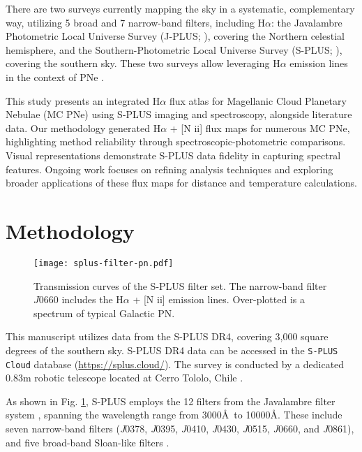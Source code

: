 \documentclass[baaa]{baaa}
\begin{document}
There are two surveys currently mapping the sky in a systematic, complementary way, utilizing 5 broad and 7 narrow-band filters,
including H$\alpha$: the Javalambre Photometric Local Universe Survey (J-PLUS; \citealp{Cenarro:2019}), covering the Northern celestial hemisphere,
and the Southern-Photometric Local Universe Survey (S-PLUS; \citealp{Mendes:2019}), covering the southern sky. These two surveys allow leveraging H$\alpha$ emission lines in the context of PNe \citep{Gutierrez:2020}.

This study presents an integrated H$\alpha$ flux atlas for Magellanic Cloud Planetary Nebulae (MC PNe) using S-PLUS imaging and
spectroscopy, alongside literature data. Our methodology generated H$\alpha$ + [N {\sc ii}] flux maps for numerous MC PNe,
highlighting method reliability through spectroscopic-photometric comparisons. Visual representations demonstrate S-PLUS data
fidelity in capturing spectral features. Ongoing work focuses on refining analysis techniques and exploring broader applications of these flux maps for distance and temperature calculations.

\section{Methodology}\label{sec:metho}

\begin{figure}
\centering
\texttt{[image: splus-filter-pn.pdf]}
\caption{Transmission curves of the S-PLUS filter set. The narrow-band filter
      $J0660$ includes the H$\alpha$ + [N {\sc ii}] emission lines.  Over-plotted is a spectrum of typical Galactic PN.}%
\label{fig:filter-PN}
\end{figure}

This manuscript utilizes data from the S-PLUS DR4, covering 3,000 square degrees of the southern sky. S-PLUS DR4 data can be accessed in the \texttt{S-PLUS Cloud} database (\url{https://splus.cloud/}). The survey is conducted by a dedicated 0.83m robotic telescope located at Cerro Tololo, Chile \citep{Mendes:2019}.


As shown in Fig. \ref{fig:filter-PN}, S-PLUS employs the 12 filters from the Javalambre filter system \citep{Marin-Franch:2012}, spanning the wavelength range from 3000\AA\ to 10000\AA. These include seven narrow-band filters (\textit{J}0378, \textit{J}0395, \textit{J}0410, \textit{J}0430, \textit{J}0515, \textit{J}0660, and \textit{J}0861), and five broad-band Sloan-like filters \citep{Fukugita:1996}.
\end{document}
